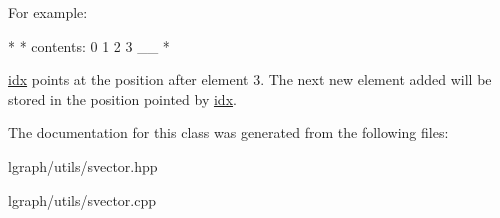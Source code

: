 For example\-: \begin{DoxyVerb}*                   \/
* contents: 0 1 2 3 __
* \end{DoxyVerb}
 \hyperlink{classlgraph_1_1utils_1_1svector_a7ef963c079c7dc8a6a559ceef81a241f}{idx} points at the position after element 3. The next new element added will be stored in the position pointed by \hyperlink{classlgraph_1_1utils_1_1svector_a7ef963c079c7dc8a6a559ceef81a241f}{idx}. 

The documentation for this class was generated from the following files\-:\begin{DoxyCompactItemize}
\item 
lgraph/utils/svector.\-hpp\item 
lgraph/utils/svector.\-cpp\end{DoxyCompactItemize}
